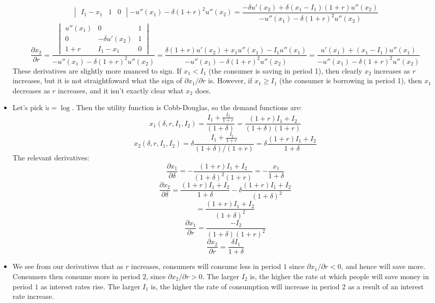 \documentclass[10pt,letter]{article}
\begin{document}
\begin{itemize}
\[{\begin{vmatrix}
I_1-x_1 & 1 & 0
\end{vmatrix}}{- u''(x_1)- \delta (1+r)^2u''(x_2)} = \frac{-\delta u'(x_2) + \delta (x_1 - I_1)(1+r) u''(x_2) }{- u''(x_1)- \delta (1+r)^2u''(x_2)} \]
\[ \frac{\partial x_2}{\partial r} = \frac{\begin{vmatrix}
u''(x_1) & 0 & 1 \\
0 &  -\delta u'(x_2) & 1 \\
1+r & I_1-x_1 & 0
\end{vmatrix}}{- u''(x_1)- \delta (1+r)^2u''(x_2)} = \frac{\delta (1+r) u'(x_2) +  x_1 u''(x_1) - I_1 u''(x_1)}{- u''(x_1)- \delta (1+r)^2u''(x_2)} = \frac{u'(x_1) +  (x_1-I_1) u''(x_1)}{- u''(x_1)- \delta (1+r)^2u''(x_2)}\]
These derivatives are slightly more nuanced to sign. If $x_1 < I_1$ (the consumer is saving in period 1), then clearly $x_2$ increases as $r$ increases, but it is not straightfoward what the sign of $\partial x_1 /\partial r$ is. However, if $x_1 \ge I_1$ (the consumer is borrowing in period 1), then $x_1$ decreases as $r$ increases, and it isn't exactly clear what $x_2$ does.
\item Let's pick $\tilde{u} = \log$. Then the utility function is Cobb-Douglas, so the demand functions are:
\[ x_1(\delta, r, I_1, I_2) = \frac{I_1 + \frac{I_2}{1+r}}{(1+\delta)} = \frac{(1+r)I_1 + I_2}{(1+\delta)(1+r)} \]
\[ x_2(\delta, r, I_1, I_2) = \delta \frac{I_1 + \frac{I_2}{1+r}}{(1+\delta)/(1+r)}= \delta \frac{(1+r) I_1 + I_2}{1 + \delta} \]
The relevant derivatives:
\[ \frac{\partial x_1}{\partial \delta} = - \frac{(1+r)I_1 + I_2}{(1+\delta)^2(1+r)} = -\frac{x_1}{1+\delta}\]
\[ \frac{\partial x_2}{\partial \delta} = \frac{(1+r) I_1 + I_2}{1 + \delta} - \delta \frac{(1+r) I_1 + I_2}{(1 + \delta)^2} \]
\[ = \frac{(1+r) I_1 + I_2}{(1 + \delta)^2} \]
\[ \frac{\partial x_1}{\partial r} = \frac{ - I_2}{(1+\delta)(1+r)^2} \]
\[ \frac{\partial x_2}{\partial r} = \frac{\delta I_1}{1+\delta} \]
\item We see from our derivatives that as $r$ increases, consumers will consume less in period $1$ since $\partial x_1 / \partial r < 0$, and hence will save more. Consumers then consume more in period $2$, since $\partial x_2 / \partial r > 0$. The larger $I_2$ is, the higher the rate at which people will save money in period $1$ as interest rates rise. The larger $I_1$ is, the higher the rate of consumption will increase in period 2 as a result of an interest rate increase.
\end{itemize}
\end{document}
